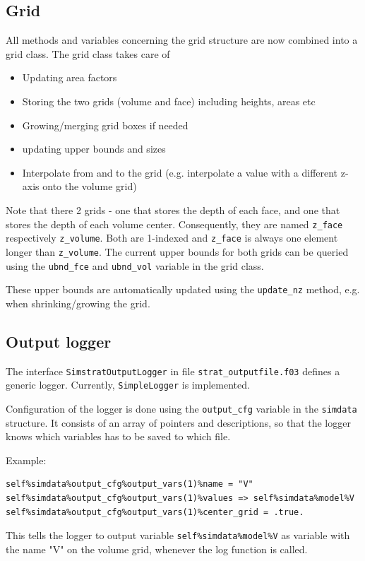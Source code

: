 \documentclass[paper=a4, fontsize=12pt]{article}
\begin{document}
\subsection{Grid}
All methods and variables concerning the grid structure are now combined into a grid class.
The grid class takes care of 
\begin{itemize}
	\item Updating area factors
	\item Storing the two grids (volume and face) including heights, areas etc
	\item Growing/merging grid boxes if needed
	\item updating upper bounds and sizes
	\item Interpolate from and to the grid (e.g. interpolate a value with a different z-axis onto the volume grid)
\end{itemize}

Note that there 2 grids - one that stores the depth of each face, and one that stores the depth of each volume center.
Consequently, they are named \texttt{z\_face} respectively \texttt{z\_volume}. Both are 1-indexed and \texttt{z\_face} is always one element longer than \texttt{z\_volume}. The current upper bounds for both grids can be queried using the \texttt{ubnd\_fce} and \texttt{ubnd\_vol} variable in the grid class. 

These upper bounds are automatically updated using the \texttt{update\_nz} method, e.g. when shrinking/growing the grid.


\subsection{Output logger} 
The interface \texttt{SimstratOutputLogger} in file \texttt{strat\_outputfile.f03} defines a generic logger. Currently, \texttt{SimpleLogger} is implemented.

Configuration of the logger is done using the \texttt{output\_cfg} variable in the \texttt{simdata} structure. It consists of an array of pointers and descriptions, so that the logger knows which variables has to be saved to which file. 

Example:
\begin{verbatim}
self%simdata%output_cfg%output_vars(1)%name = "V"
self%simdata%output_cfg%output_vars(1)%values => self%simdata%model%V
self%simdata%output_cfg%output_vars(1)%center_grid = .true.
\end{verbatim}

This tells the logger to output variable \texttt{self\%simdata\%model\%V} as variable with the name "V" on the volume grid, whenever the log function is called.
\end{document}
